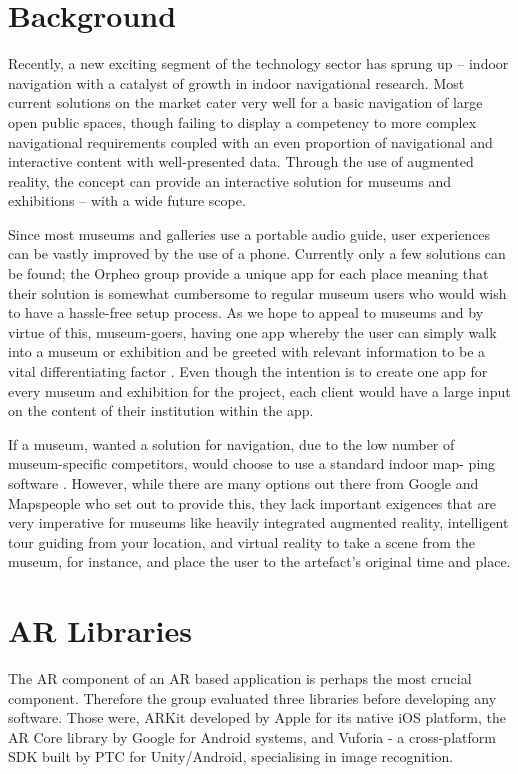 \section{Background}
Recently, a new exciting segment of the technology sector has sprung up – indoor navigation with a catalyst of growth in indoor navigational research. Most current solutions on the market cater very well for a basic navigation of large open public spaces, though failing to display a competency to more complex navigational requirements coupled with an even proportion of navigational and interactive content with well-presented data. Through the use of augmented reality, the concept can provide an interactive solution for museums and exhibitions – with a wide future scope.

Since most museums and galleries use a portable audio guide, user experiences can be vastly improved by the use of a phone. Currently only a few solutions can be found; the Orpheo group \cite{orpheo} provide a unique app for each place meaning that their solution is somewhat cumbersome to regular museum users who would wish to have a hassle-free setup process. As we hope to appeal to museums and by virtue of this, museum-goers, having one app whereby the user can simply walk into a museum or exhibition and be greeted with relevant information to be a vital differentiating factor \cite{microsoft}. Even though the intention is to create one app for every museum and exhibition for the project, each client would have a large input on the content of their institution within the app. 

If a museum, wanted a solution for navigation, due to the low number of museum-specific competitors, would choose to use a standard indoor map- ping software \cite{murphy}. However, while there are many options out there from Google and Mapspeople \cite{mapspeople} who set out to provide this, they lack important exigences that are very imperative for museums like heavily integrated augmented reality, intelligent tour guiding from your location, and virtual reality to take a scene from the museum, for instance, and place the user to the artefact’s original time and place. 

\section{AR Libraries}
The AR component of an AR based application is perhaps the most crucial component. Therefore the group evaluated three libraries before developing any software. Those were, ARKit developed by Apple for its native iOS platform, the AR Core library by Google for Android systems, and Vuforia - a cross-platform SDK built by PTC for Unity/Android, specialising in image recognition.


